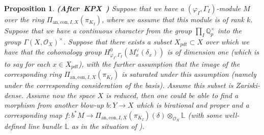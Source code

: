 \documentclass[12pt]{amsart}
\newtheorem{proposition}[theorem]{Proposition}
\theoremstyle{definition}
\numberwithin{equation}{section}
\begin{document}
\begin{proposition} \mbox{\bf{(After KPX \cite[Theorem 6.3.9]{KPX})}}
Suppose that we have a $(\varphi_I,\Gamma_I)$-module $M$ over the ring $\Pi_{\mathrm{an},\mathrm{con},I,X}(\pi_{K_I})$, where we assume that this module is of rank $k$. Suppose that we have a continuous character from the group $\prod_I \mathbb{Q}_p^\times$ into the group $\Gamma(X,\mathcal{O}_X)^\times$. Suppose that there exists a subset $X_{pdt}\subset X$ over which we have that the cohomology group $H^0_{\varphi_I,\Gamma_I}(M_x^\vee(\delta_x))$ is of dimension one (which is to say for each $x\in X_{pdt}$), with the further assumption that the image of the corresponding ring $\Pi_{\mathrm{an},\mathrm{con},I,X}(\pi_{K_I})$ is saturated under this assumption (namely under the corresponding consideration of the basis). Assume this subset is Zariski-dense. Assume now the space $X$ is reduced, then one could be able to find a morphism from another blow-up $b:Y\rightarrow X$ which is birational and proper and a corresponding map $f:b^*M\rightarrow \Pi_{\mathrm{an},\mathrm{con},I,X}(\pi_{K_I})(\delta)\otimes_{\mathcal{O}_X}\mathbb{L}$ (with some well-defined line bundle $\mathbb{L}$ as in the situation of \cite[Theorem 6.3.9]{KPX}). 


\end{proposition}
\end{document}
